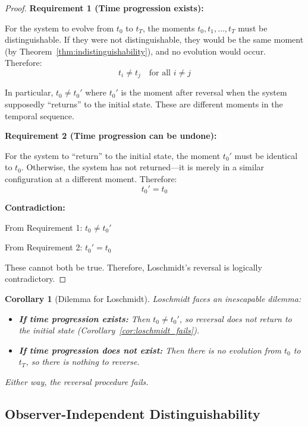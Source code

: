 \documentclass[twocolumn,10pt]{article}
\newtheorem{corollary}[theorem]{Corollary}
\theoremstyle{definition}
\theoremstyle{remark}
\begin{document}
\begin{proof}
\textbf{Requirement 1 (Time progression exists):}

For the system to evolve from $t_0$ to $t_T$, the moments $t_0, t_1, \ldots, t_T$ must be distinguishable. If they were not distinguishable, they would be the same moment (by Theorem~\ref{thm:indistinguishability}), and no evolution would occur. Therefore:
\begin{equation}
t_i \neq t_j \quad \text{for all } i \neq j
\end{equation}

In particular, $t_0 \neq t_0'$ where $t_0'$ is the moment after reversal when the system supposedly ``returns'' to the initial state. These are different moments in the temporal sequence.

\vspace{0.2cm}
\noindent\textbf{Requirement 2 (Time progression can be undone):}

For the system to ``return'' to the initial state, the moment $t_0'$ must be identical to $t_0$. Otherwise, the system has not returned—it is merely in a similar configuration at a different moment. Therefore:
\begin{equation}
t_0' = t_0
\end{equation}

\vspace{0.2cm}
\noindent\textbf{Contradiction:}

From Requirement 1: $t_0 \neq t_0'$

From Requirement 2: $t_0' = t_0$

These cannot both be true. Therefore, Loschmidt's reversal is logically contradictory.
\end{proof}

\begin{corollary}[Dilemma for Loschmidt]
\label{cor:loschmidt_dilemma}
Loschmidt faces an inescapable dilemma:
\begin{itemize}
\item \textbf{If time progression exists:} Then $t_0 \neq t_0'$, so reversal does not return to the initial state (Corollary~\ref{cor:loschmidt_fails}).
\item \textbf{If time progression does not exist:} Then there is no evolution from $t_0$ to $t_T$, so there is nothing to reverse.
\end{itemize}
Either way, the reversal procedure fails.
\end{corollary}

\subsection{Observer-Independent Distinguishability}
\end{document}
